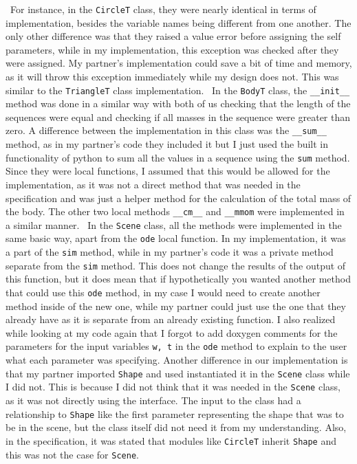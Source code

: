 \documentclass[12pt]{article}
\begin{document}
~\newline\noindent For instance, in the \verb|CircleT| class, they were nearly identical in terms of implementation, besides the variable names being different from one another. The only other difference was that they raised a value error before assigning the self parameters, while in my implementation, this exception was checked after they were assigned. My partner's implementation could save a bit of time and memory, as it will throw this exception immediately while my design does not. This was similar to the \verb|TriangleT| class implementation. 
~\newline\noindent In the \verb|BodyT| class, the \verb|__init__| method was done in a similar way with both of us checking that the length of the sequences were equal and checking if all masses in the sequence were greater than zero. A difference between the implementation in this class was the \verb|__sum__| method, as in my partner's code they included it but I just used the built in functionality of python to sum all the values in a sequence using the \verb|sum| method. Since they were local functions, I assumed that this would be allowed for the implementation, as it was not a direct method that was needed in the specification and was just a helper method for the calculation of the total mass of the body. The other two local methods \verb|__cm__| and \verb|__mmom| were implemented in a similar manner. 
~\newline\noindent In the \verb|Scene| class, all the methods were implemented in the same basic way, apart from the \verb|ode| local function. In my implementation, it was a part of the \verb|sim| method, while in my partner's code it was a private method separate from the \verb|sim| method. This does not change the results of the output of this function, but it does mean that if hypothetically you wanted another method that could use this \verb|ode| method, in my case I would need to create another method inside of the new one, while my partner could just use the one that they already have as it is separate from an already existing function. I also realized while looking at my code again that I forgot to add doxygen comments for the parameters for the input variables \verb|w, t| in the \verb|ode| method to explain to the user what each parameter was specifying. Another difference in our implementation is that my partner imported \verb|Shape| and used instantiated it in the \verb|Scene| class while I did not. This is because I did not think that it was needed in the \verb|Scene| class, as it was not directly using the interface. The input to the class had a relationship to \verb|Shape| like the first parameter representing the shape that was to be in the scene, but the class itself did not need it from my understanding. Also, in the specification, it was stated that modules like \verb|CircleT| inherit \verb|Shape| and this was not the case for \verb|Scene|. 
\end{document}
